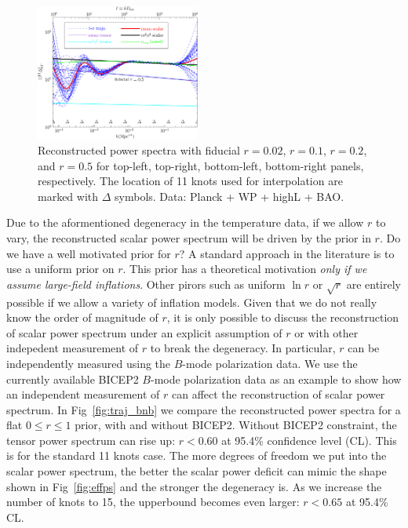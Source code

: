 \documentclass[11pt]{article}
\def \halffigwidth{0.48\textwidth}
\begin{document}
\begin{figure}
  \includegraphics[width=\halffigwidth]{nobicep_spline0_p11_r0d5_power_traj.pdf}
  \caption{Reconstructed power spectra with fiducial $r = 0.02$, $r=0.1$, $r=0.2$, and $r=0.5$ for top-left, top-right, bottom-left, bottom-right panels, respectively. The location of 11 knots used for interpolation are marked with $\Delta$ symbols. Data: Planck + WP + highL + BAO. \label{fig:traj_power_fixr}}
\end{figure}


Due to the aformentioned degeneracy in the temperature data, if we allow $r$ to vary, the reconstructed scalar power spectrum will be driven by the prior in $r$. Do we have a well motivated prior for $r$? A standard approach in the literature is to use a uniform prior on $r$. This prior has a theoretical motivation {\it only if we assume large-field inflations}. Other pirors such as uniform $\ln r$ or $\sqrt{r}$ are entirely possible if we allow a variety of inflation models. Given that we do not really know the order of magnitude of $r$, it is only possible to discuss the reconstruction of scalar power spectrum under an explicit assumption of $r$ or with other indepedent measurement of $r$ to break the degeneracy. In particular, $r$ can be independently measured using the $B$-mode polarization data. We use the currently available BICEP2 $B$-mode polarization data as an example to show how an independent measurement of $r$ can affect the reconstruction of scalar power spectrum. In Fig~\ref{fig:traj_bnb} we compare the reconstructed power spectra for a flat $0\le r \le 1$ prior, with and without BICEP2. Without BICEP2 constraint, the tensor power spectrum can rise up: $r < 0.60$ at 95.4\% confidence level (CL). This is for the standard 11 knots case. The more degrees of freedom we put into the scalar power spectrum, the better the scalar power deficit can mimic the shape shown in Fig~\ref{fig:effps} and the stronger the degeneracy is. As we increase the number of knots to 15, the upperbound becomes even larger: $ r < 0.65$ at 95.4\% CL. 
\end{document}
